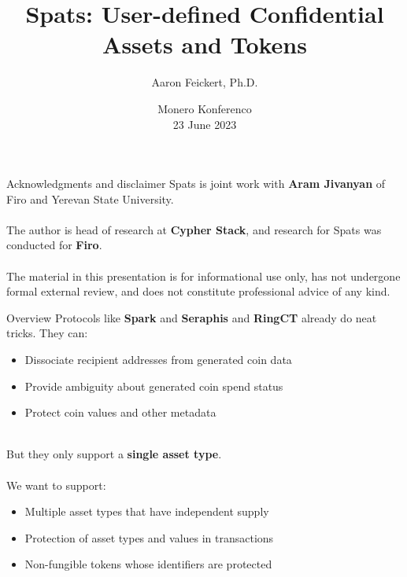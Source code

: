 \documentclass[aspectratio=169]{beamer}
\title{Spats: User-defined Confidential Assets and Tokens}
\author{Aaron Feickert, Ph.D.}
\date{Monero Konferenco \\ 23 June 2023}
\begin{document}
\frame{\titlepage}

\begin{frame}{Acknowledgments and disclaimer}
	Spats is joint work with \textbf{Aram Jivanyan} of Firo and Yerevan State University. \\~\\

	The author is head of research at \textbf{Cypher Stack}, and research for Spats was conducted for \textbf{Firo}. \\~\\

	The material in this presentation is for informational use only, has not undergone formal external review, and does not constitute professional advice of any kind.
\end{frame}

\begin{frame}{Overview}
	Protocols like \textbf{Spark} and \textbf{Seraphis} and \textbf{RingCT} already do neat tricks. They can:
	\begin{itemize}
		\item Dissociate recipient addresses from generated coin data
		\item Provide ambiguity about generated coin spend status
		\item Protect coin values and other metadata \\~\\
	\end{itemize}

	But they only support a \textbf{single asset type}. \\~\\

	We want to support:
	\begin{itemize}
		\item Multiple asset types that have independent supply
		\item Protection of asset types and values in transactions
		\item Non-fungible tokens whose identifiers are protected
	\end{itemize}
\end{frame}
\end{document}

